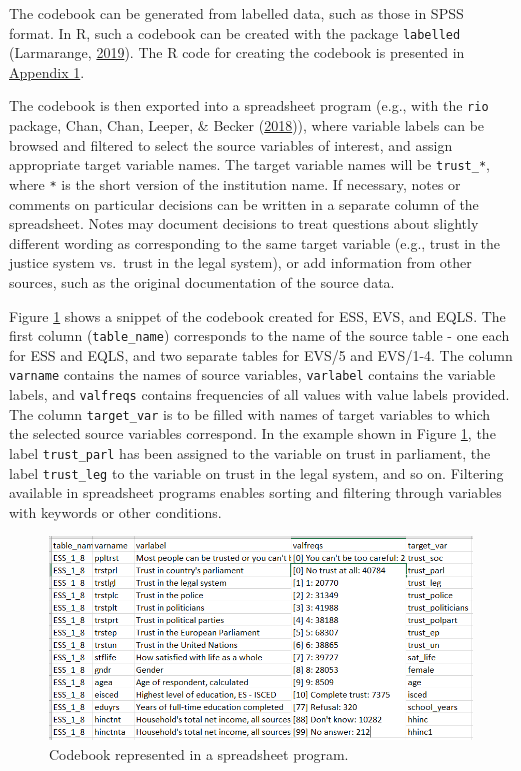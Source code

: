 \documentclass[12pt,]{article}
\begin{document}
The codebook can be generated from labelled data, such as those in SPSS format. In R, such a codebook can be created with the package \texttt{labelled} (Larmarange, \protect\hyperlink{ref-labelled}{2019}). The R code for creating the codebook is presented in \protect\hyperlink{appendix1}{Appendix 1}.

The codebook is then exported into a spreadsheet program (e.g., with the \texttt{rio} package, Chan, Chan, Leeper, \& Becker (\protect\hyperlink{ref-rio}{2018})), where variable labels can be browsed and filtered to select the source variables of interest, and assign appropriate target variable names. The target variable names will be \texttt{trust\_*}, where \texttt{*} is the short version of the institution name. If necessary, notes or comments on particular decisions can be written in a separate column of the spreadsheet. Notes may document decisions to treat questions about slightly different wording as corresponding to the same target variable (e.g., trust in the justice system vs.~trust in the legal system), or add information from other sources, such as the original documentation of the source data.

Figure \ref{fig:codebook} shows a snippet of the codebook created for ESS, EVS, and EQLS. The first column (\texttt{table\_name}) corresponds to the name of the source table - one each for ESS and EQLS, and two separate tables for EVS/5 and EVS/1-4. The column \texttt{varname} contains the names of source variables, \texttt{varlabel} contains the variable labels, and \texttt{valfreqs} contains frequencies of all values with value labels provided. The column \texttt{target\_var} is to be filled with names of target variables to which the selected source variables correspond. In the example shown in Figure \ref{fig:codebook}, the label \texttt{trust\_parl} has been assigned to the variable on trust in parliament, the label \texttt{trust\_leg} to the variable on trust in the legal system, and so on. Filtering available in spreadsheet programs enables sorting and filtering through variables with keywords or other conditions.

\begin{figure}[H]
\includegraphics[width=465px]{../pictures/codebook_full} \caption{Codebook represented in a spreadsheet program.}\label{fig:codebook}
\end{figure}
\end{document}
